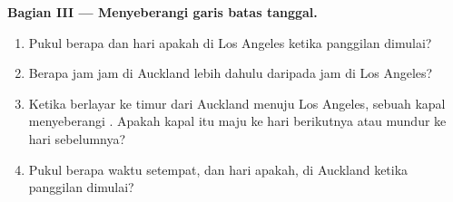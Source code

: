 \begin{problem}
\medskip
\noindent\textbf{Bagian III --- Menyeberangi garis batas tanggal.}
\begin{enumerate}[resume]
  \item Pukul berapa dan hari apakah di Los Angeles ketika panggilan
        dimulai?
  \item Berapa jam jam di Auckland lebih dahulu daripada jam di Los Angeles?
  \item Ketika berlayar ke timur dari Auckland menuju Los Angeles, sebuah
        kapal menyeberangi . Apakah kapal itu maju ke hari
        berikutnya atau mundur ke hari sebelumnya?
  \item Pukul berapa waktu setempat, dan hari apakah, di Auckland ketika
        panggilan dimulai?
\end{enumerate}
\end{problem}
